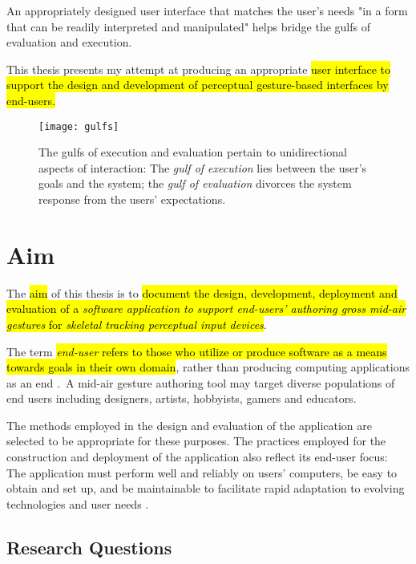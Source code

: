 An appropriately designed user interface that matches the user's needs "in a form that can be readily interpreted and manipulated" \parencite{Norman:1986} helps bridge the gulfs of evaluation and execution.

This thesis presents my attempt at producing an appropriate \hl{user interface to support the design and development of perceptual gesture-based interfaces by end-users.}

\begin{SCfigure}[\sidecaptionrelwidth][t]
\centering
\texttt{[image: gulfs]}
\caption{The gulfs of execution and evaluation pertain to unidirectional aspects of interaction: The \emph{gulf of execution} lies between the user's goals and the system; the \emph{gulf of evaluation} divorces the system response from the users' expectations.}
\label{fig:gulfs}
\end{SCfigure}

\section{Aim} %

The \hl{aim} of this thesis is to \hl{document the design, development, deployment and evaluation of a \emph{software application to support end-users' authoring gross mid-air gestures} for \emph{skeletal tracking perceptual input devices}}.

The term \hl{\emph{end-user} refers to those who utilize or produce software as a means towards goals in their own domain}, rather than producing computing applications as an end \parencite{Ko:2011}.\ A mid-air gesture authoring tool may target diverse populations of end users including designers, artists, hobbyists, gamers and educators.

The methods employed in the design and evaluation of the application are selected to be appropriate for these purposes. The practices employed for the construction and deployment of the application also reflect its end-user focus: The application must perform well and reliably on users' computers, be easy to obtain and set up, and be maintainable to facilitate rapid adaptation to evolving technologies and user needs \parencite{McConnell:2009, Brooks:1995}.

\subsection{Research Questions} %

